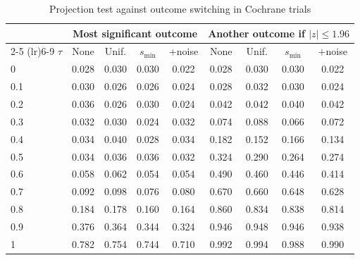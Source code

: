 \begin{table}[htbp]
\centering
\caption{Projection test against outcome switching in Cochrane trials}
\label{tab:cochrane_switching_power_desktop_proj}
\footnotesize
\setlength{\tabcolsep}{4pt}
\begin{tabular}{lcccccccc}
\toprule
 & \multicolumn{4}{c}{Most significant outcome} & \multicolumn{4}{c}{Another outcome if $|z| \le 1.96$} \\
\cmidrule(lr){2-5} \cmidrule(lr){6-9}
$\tau$ & None & Unif. & $s_{\min}$ & $+$noise & None & Unif. & $s_{\min}$ & $+$noise \\
\midrule
0 & 0.028 & 0.030 & 0.030 & 0.022 & 0.028 & 0.030 & 0.030 & 0.022 \\
0.1 & 0.030 & 0.026 & 0.026 & 0.024 & 0.028 & 0.032 & 0.030 & 0.024 \\
0.2 & 0.036 & 0.026 & 0.030 & 0.024 & 0.042 & 0.042 & 0.040 & 0.042 \\
0.3 & 0.032 & 0.030 & 0.024 & 0.032 & 0.074 & 0.088 & 0.066 & 0.072 \\
0.4 & 0.034 & 0.040 & 0.028 & 0.034 & 0.182 & 0.152 & 0.166 & 0.134 \\
0.5 & 0.034 & 0.036 & 0.036 & 0.032 & 0.324 & 0.290 & 0.264 & 0.274 \\
0.6 & 0.058 & 0.062 & 0.054 & 0.054 & 0.490 & 0.460 & 0.446 & 0.414 \\
0.7 & 0.092 & 0.098 & 0.076 & 0.080 & 0.670 & 0.660 & 0.648 & 0.628 \\
0.8 & 0.184 & 0.178 & 0.160 & 0.164 & 0.860 & 0.834 & 0.838 & 0.814 \\
0.9 & 0.376 & 0.364 & 0.344 & 0.324 & 0.946 & 0.948 & 0.946 & 0.938 \\
1 & 0.782 & 0.754 & 0.744 & 0.710 & 0.992 & 0.994 & 0.988 & 0.990 \\
\bottomrule
\end{tabular}
\par\smallskip

\end{table}
